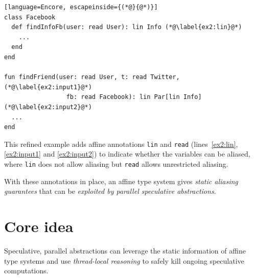 \documentclass[sigplan]{acmart}
\begin{document}
\begin{lstlisting}[language=Encore, escapeinside={(*@}{@*)}]
class Facebook
  def findInfoFb(user: read User): lin Info (*@\label{ex2:lin}@*)
    ...
  end
end

fun findFriend(user: read User, t: read Twitter,(*@\label{ex2:input1}@*)
                 fb: read Facebook): lin Par[lin Info](*@\label{ex2:input2}@*)
  ...
end
\end{lstlisting}

This refined example adds affine annotations \verb|lin|
and \verb|read| (lines~\ref{ex2:lin}, \ref{ex2:input1} and \ref{ex2:input2}) to
indicate whether the variables can be aliased, where \verb|lin|
does not allow aliasing but \verb|read| allows unrestricted aliasing.

With these annotations in place, an affine type system
gives \emph{static aliasing guarantees}
that can be \emph{exploited by parallel speculative abstractions}.

\section{Core idea}

Speculative, parallel abstractions can leverage the static
information of affine type systems
%
and use \emph{thread-local reasoning} to safely kill
ongoing speculative computations.
\end{document}
